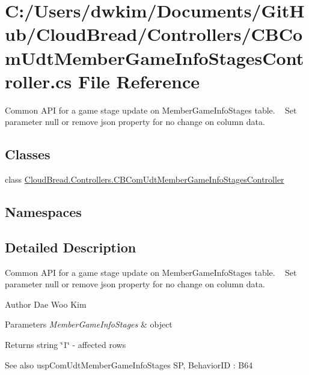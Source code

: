 \hypertarget{a00136}{}\section{C\+:/\+Users/dwkim/\+Documents/\+Git\+Hub/\+Cloud\+Bread/\+Controllers/\+C\+B\+Com\+Udt\+Member\+Game\+Info\+Stages\+Controller.cs File Reference}
\label{a00136}


Common A\+PI for a game stage update on Member\+Game\+Info\+Stages table. ~\newline
Set parameter null or remove json property for no change on column data.  


\subsection*{Classes}
\begin{DoxyCompactItemize}
\item 
class \hyperlink{a00024}{Cloud\+Bread.\+Controllers.\+C\+B\+Com\+Udt\+Member\+Game\+Info\+Stages\+Controller}
\end{DoxyCompactItemize}
\subsection*{Namespaces}
\begin{DoxyCompactItemize}
\end{DoxyCompactItemize}


\subsection{Detailed Description}
Common A\+PI for a game stage update on Member\+Game\+Info\+Stages table. ~\newline
Set parameter null or remove json property for no change on column data. 

\begin{DoxyAuthor}{Author}
Dae Woo Kim 
\end{DoxyAuthor}

\begin{DoxyParams}{Parameters}
{\em Member\+Game\+Info\+Stages} & object \\
\hline
\end{DoxyParams}
\begin{DoxyReturn}{Returns}
string \char`\"{}1\char`\"{} -\/ affected rows 
\end{DoxyReturn}
\begin{DoxySeeAlso}{See also}
usp\+Com\+Udt\+Member\+Game\+Info\+Stages SP, Behavior\+ID \+: B64 
\end{DoxySeeAlso}
